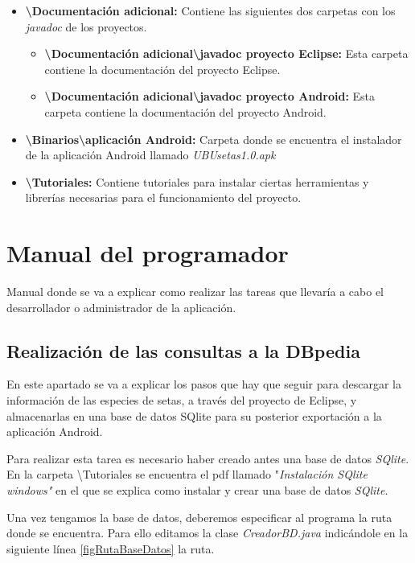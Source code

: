 \begin{itemize}
	\item \textbf{\textbackslash Documentación adicional:} Contiene las siguientes dos carpetas con los \textit{javadoc} de los proyectos.
	\begin{itemize}
	 	\item \textbf{\textbackslash Documentación adicional\textbackslash javadoc proyecto Eclipse:} Esta carpeta contiene la documentación del proyecto Eclipse.
	 	\item \textbf{\textbackslash Documentación adicional\textbackslash javadoc proyecto Android:} Esta carpeta contiene la documentación del proyecto Android.
	\end{itemize}
	 
	\item \textbf{\textbackslash Binarios\textbackslash aplicación Android:} Carpeta donde se encuentra el instalador de la aplicación Android llamado \textit{UBUsetas1.0.apk}
	 
	\item \textbf{\textbackslash Tutoriales:} Contiene tutoriales para instalar ciertas herramientas y librerías necesarias para el funcionamiento del proyecto.
	
\end{itemize}

\section{Manual del programador}

Manual donde se va a explicar como realizar las tareas que llevaría a cabo el desarrollador o administrador de la aplicación.

\subsection{Realización de las consultas a la DBpedia}

En este apartado se va a explicar los pasos que hay que seguir para descargar la información de las especies de setas, a través del proyecto de Eclipse, y almacenarlas en una base de datos SQlite para su posterior exportación a la aplicación Android.

Para realizar esta tarea es necesario haber creado antes una base de datos \textit{SQlite}. En la carpeta \textbackslash Tutoriales se encuentra el pdf llamado "\textit{Instalación SQlite windows"} en el que se explica como instalar y crear una base de datos \textit{SQlite}.

Una vez tengamos la base de datos, deberemos especificar al programa la ruta donde se encuentra. Para ello editamos la clase \textit{CreadorBD.java} indicándole en la siguiente línea \ref{figRutaBaseDatos} la ruta.


